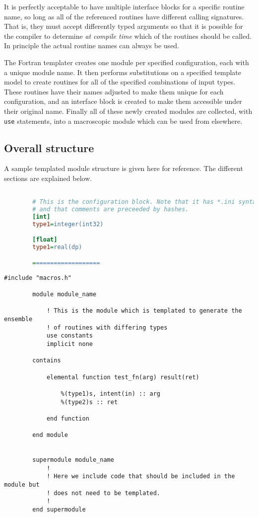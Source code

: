 \documentclass[a4paper,notitlepage,dvipsnames]{scrreprt}
\let\code\lstinline
\begin{document}
	It is perfectly acceptable to have multiple interface blocks for a specific
	routine name, so long as all of the referenced routines have different
	calling signatures. That is, they must accept differently typed arguments
	so that it is possible for the compiler to determine \emph{at compile time}
	which of the routines should be called. In principle the actual routine
	names can always be used.

	The Fortran templater creates one module per specified configuration,
	each with a unique module name. It then performs substitutions on a
	specified template model to create routines for all of the specified
	combinations of input types. These routines have their names adjusted to
	make them unique for each configuration, and an interface block is created
	to make them accessible under their original name. Finally all of these
	newly created modules are collected, with \code{use} statements, into
	a macroscopic module which can be used from elsewhere.

\subsection{Overall structure}
	A sample templated module structure is given here for reference. The
	different sections are explained below.

	\begin{lstlisting}[gobble=4,language=ini]

		# This is the configuration block. Note that it has *.ini syntax,
		# and that comments are preceeded by hashes.
		[int]
		type1=integer(int32)

		[float]
		type1=real(dp)

		===================
	\end{lstlisting}
	\begin{lstlisting}[gobble=4]
		#include "macros.h"

		module module_name

			! This is the module which is templated to generate the ensemble
			! of routines with differing types
			use constants
			implicit none

		contains

			elemental function test_fn(arg) result(ret)

				%(type1)s, intent(in) :: arg
				%(type2)s :: ret

			end function

		end module


		supermodule module_name
			!
			! Here we include code that should be included in the module but
			! does not need to be templated.
			!
		end supermodule


	\end{lstlisting}
\end{document}
